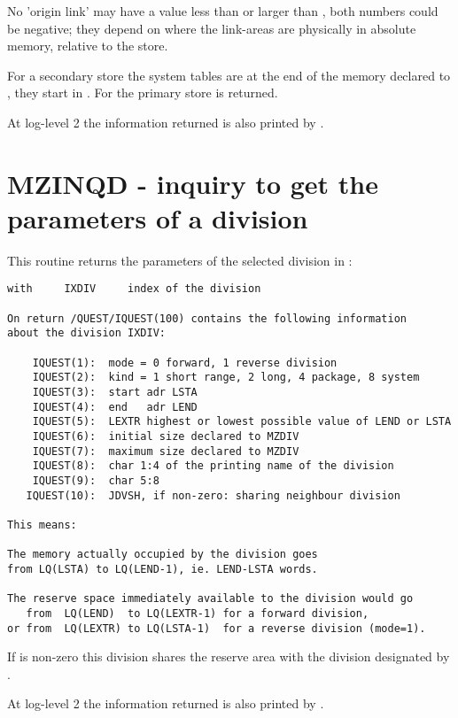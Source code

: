 No 'origin link' may have a value less than  or larger than ,
both numbers could be negative; they depend on where the link-areas are
physically in absolute memory, relative to the store.

For a secondary store the system tables are at the end of
the memory declared to , they start in .
For the primary store  is returned.

At log-level 2 the information returned is also printed by .

\section{MZINQD - inquiry to get the parameters of a division}

This routine returns the parameters of the selected division in \IQUEST:


\begin{verbatim}
with     IXDIV     index of the division

On return /QUEST/IQUEST(100) contains the following information
about the division IXDIV:

    IQUEST(1):  mode = 0 forward, 1 reverse division
    IQUEST(2):  kind = 1 short range, 2 long, 4 package, 8 system
    IQUEST(3):  start adr LSTA
    IQUEST(4):  end   adr LEND
    IQUEST(5):  LEXTR highest or lowest possible value of LEND or LSTA
    IQUEST(6):  initial size declared to MZDIV
    IQUEST(7):  maximum size declared to MZDIV
    IQUEST(8):  char 1:4 of the printing name of the division
    IQUEST(9):  char 5:8
   IQUEST(10):  JDVSH, if non-zero: sharing neighbour division

This means:

The memory actually occupied by the division goes
from LQ(LSTA) to LQ(LEND-1), ie. LEND-LSTA words.

The reserve space immediately available to the division would go
   from  LQ(LEND)  to LQ(LEXTR-1) for a forward division,
or from  LQ(LEXTR) to LQ(LSTA-1)  for a reverse division (mode=1).
\end{verbatim} 

If  is non-zero this division shares the reserve area with
the division designated by .

At log-level 2 the information returned is also printed by .

